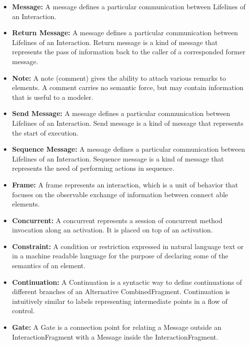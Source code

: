 \begin{itemize}
	\item \textbf{Message:} A message defines a particular communication between Lifelines of an Interaction.
	
	\item \textbf{Return Message:} A message defines a particular communication between Lifelines of an Interaction. Return message is a kind of message that represents the pass of information back to the caller of a corresponded former message.
	
	\item \textbf{Note:} A note (comment) gives the ability to attach various remarks to elements. A comment carries no semantic force, but may contain information that is useful to a modeler.
	
	\item \textbf{Send Message:} A message defines a particular communication between Lifelines of an Interaction. Send message is a kind of message that represents the start of execution.
	
	\item \textbf{Sequence Message:} A message defines a particular communication between Lifelines of an Interaction. Sequence message is a kind of message that represents the need of performing actions in sequence.
	
	\item \textbf{Frame:} A frame represents an interaction, which is a unit of behavior that focuses on the observable exchange of information between connect able elements.
	
	\item \textbf{Concurrent:} A concurrent represents a session of concurrent method invocation along an activation. It is placed on top of an activation.
	
	\item \textbf{Constraint:} A condition or restriction expressed in natural language text or in a machine readable language for the purpose of declaring some of the semantics of an element.
	
	\item \textbf{Continuation:} A Continuation is a syntactic way to define continuations of different branches of an Alternative CombinedFragment. Continuation is intuitively similar to labels representing intermediate points in a flow of control.
	
	\item \textbf{Gate:} A Gate is a connection point for relating a Message outside an InteractionFragment with a Message inside the InteractionFragment.
	

\end{itemize}
